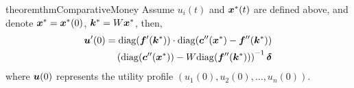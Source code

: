 \begin{restatable}{theorem}{thmComparativeMoney}
\label{thm:comparative:money}
Assume $u_i(t)$ and ${\bm{x}}^*(t)$ are defined above, and denote ${\bm{x}}^* = {\bm{x}}^*(0)$, ${\bm{k}}^* = W {\bm{x}}^*$, then,
\begin{align*}
    {\bm{u}}'(0) = \mathrm{diag}({\bm{f}}'({\bm{k}}^*)) \cdot \mathrm{diag}({\bm{c}}''({\bm{x}}^*) - {\bm{f}}''({\bm{k}}^*)) 
    \\
    \left( \mathrm{diag}({\bm{c}}''({\bm{x}}^*)) - W \mathrm{diag}({\bm{f}}''({\bm{k}}^*))\right)^{-1} \bm{\delta}
\end{align*}
where ${\bm{u}}(0)$ represents the utility profile $(u_1(0), u_2(0), \dots, u_n(0))$.
\end{restatable}